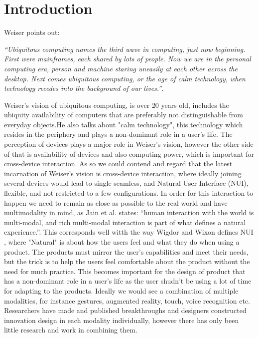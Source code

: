 \section{Introduction}
Weiser\cite{Weiser:1991} points out:
 
{\em``Ubiquitous computing names the third wave in computing, just now beginning. First were mainframes, each shared by lots of people. Now we are in the personal computing era, person and machine staring uneasily at each other across the desktop. Next comes ubiquitous computing, or the age of calm technology, when technology recedes into the background of our lives.''}.

Weiser's vision of ubiquitous computing, is over 20 years old, includes the ubiquity availability of computers that are preferably not distinguishable from everyday objects.He also talks about "calm technology", this technology which resides in the periphery and plays a non-dominant role in a user's life. The perception of devices plays a major role in Weiser's vision, however the other side of that is availability of devices and also computing power, which is important for cross-device interaction. As so we could contend and regard that the latest incarnation of Weiser's vision is cross-device interaction, where ideally joining several devices would lead to single seamless, and Natural User Interface (NUI), flexible, and not restricted to a few configurations\cite{Radle:2015}.
In order for this interaction to happen we need to remain as close as possible to the real world and have multimodality in mind, as Jain et al. states: ``human interaction with the world is multi-modal, and rich multi-modal interaction is part of what defines a natural experience.''\cite{Jain:2011}. 
This corresponds well witth the way Wigdor and Wixon defines NUI , where "Natural" is about how the users feel and what they do when using a product. The products must mirror the user's capabilities and meet their needs, but the trick is to help the users feel comfortable about the product without the need for much practice.\cite{Wigdor:2011} This becomes important for the design of product that has a non-dominant role in a user's life as the user shudn't be using a lot of time for adapting to the products.   
Ideally we would see a combination of multiple modalities, for instance gestures, augmented reality, touch, voice recognition etc. 
Researchers have made and published breakthroughs and designers constructed innovation design in each modality individually, however there has only been little research and work in combining them.\cite{Jain:2011} \\

